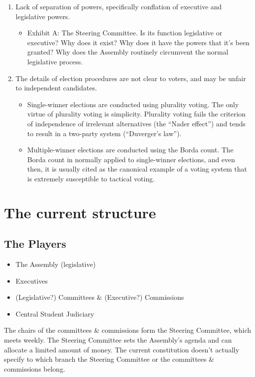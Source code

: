 \documentclass[12pt,letterpaper]{article}
\begin{document}
\begin{enumerate}
	\item Lack of separation of powers, specifically conflation of executive and legislative powers.
	\begin{itemize}
		\item Exhibit A: The Steering Committee.  Is its function legislative or executive?  Why does it exist?  Why does it have the powers that it's been granted?  Why does the Assembly routinely circumvent the normal legislative process.
	\end{itemize}
	\item The details of election procedures are not clear to voters, and may be unfair to independent candidates.
	\begin{itemize}
		\item Single-winner elections are conducted using plurality voting.  The only virtue of plurality voting is simplicity.  Plurality voting fails the criterion of independence of irrelevant alternatives (the ``Nader effect'') and tends to result in a two-party system (``Duverger's law'').
		\item Multiple-winner elections are conducted using the Borda count.  The Borda count in normally applied to single-winner elections, and even then, it is usually cited as the canonical example of a voting system that is extremely susceptible to tactical voting.
	\end{itemize}
\end{enumerate}


\section*{The current structure}

\subsection*{The Players}
	\begin{itemize}
		\item The Assembly (legislative)
		\item Executives
		\item (Legislative?) Committees \& (Executive?) Commissions
		\item Central Student Judiciary
	\end{itemize}

The chairs of the committees \& commissions form the Steering Committee, which meets weekly.  The Steering Committee sets the Assembly's agenda and can allocate a limited amount of money.  The current constitution doesn't actually specify to which branch the Steering Committee or the committees \& commissions belong.
\end{document}
